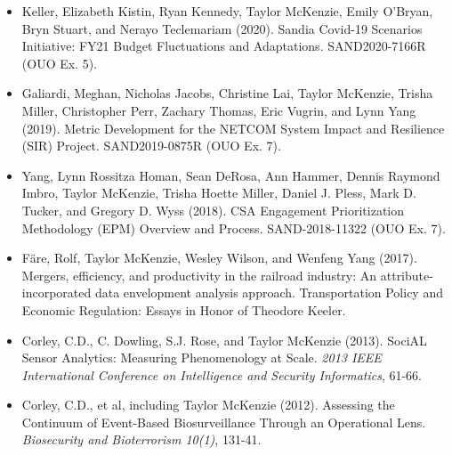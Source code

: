 \documentclass[11pt]{article}
\newenvironment{changemargin}[2]{%
  \begin{list}{}{%
    \setlength{\topsep}{0pt}%
    \setlength{\leftmargin}{#1}%
    \setlength{\rightmargin}{#2}%
    \setlength{\listparindent}{\parindent}%
    \setlength{\itemindent}{\parindent}%
    \setlength{\parsep}{\parskip}%
  }%
  \item[]}{\end{list}
}
\newcommand{\lineover}{
	\begin{changemargin}{-0.05in}{-0.05in}
		\vspace*{-8pt}
		\hrulefill \\
		\vspace*{-2pt}
	\end{changemargin}
}
\newcommand{\header}[1]{
	\begin{changemargin}{-0.5in}{-0.5in}
		\scshape{#1}\\
	\vspace*{-5pt}
  	\lineover
	\end{changemargin}
}
\newenvironment{body} {
	\vspace*{-16pt}
	\begin{changemargin}{-0.25in}{-0.5in}
  }	
	{\end{changemargin}
}
\begin{document}
\begin{body}
\begin{itemize}
	\item Keller, Elizabeth Kistin, Ryan Kennedy, Taylor McKenzie, Emily O'Bryan, Bryn Stuart, and Nerayo Teclemariam (2020). Sandia Covid-19 Scenarios Initiative: FY21 Budget Fluctuations and Adaptations. SAND2020-7166R (OUO Ex. 5).
	\item Galiardi, Meghan, Nicholas Jacobs, Christine Lai, Taylor McKenzie, Trisha Miller, Christopher Perr, Zachary Thomas, Eric Vugrin, and Lynn Yang (2019). Metric Development for the NETCOM System Impact and Resilience (SIR) Project. SAND2019-0875R (OUO Ex. 7).
	\item Yang, Lynn Rossitza Homan, Sean DeRosa, Ann Hammer, Dennis Raymond Imbro, Taylor McKenzie, Trisha Hoette Miller, Daniel J. Pless, Mark D. Tucker, and Gregory D. Wyss (2018). CSA Engagement Prioritization Methodology (EPM) Overview and Process. SAND-2018-11322 (OUO Ex. 7).
	\item F\"{a}re, Rolf, Taylor McKenzie, Wesley Wilson, and Wenfeng Yang (2017). Mergers, efficiency, and productivity in the railroad industry: An attribute-incorporated data envelopment analysis approach. Transportation Policy and Economic Regulation: Essays in Honor of Theodore Keeler.
	\item Corley, C.D., C. Dowling, S.J. Rose, and Taylor McKenzie (2013). SociAL Sensor Analytics: Measuring Phenomenology at Scale. \textit{2013 IEEE International Conference on Intelligence and Security Informatics}, 61-66.
	\item Corley, C.D., et al, including Taylor McKenzie (2012). Assessing the Continuum of Event-Based Biosurveillance Through an Operational Lens. \textit{Biosecurity and Bioterrorism 10(1)}, 131-41.
\end{itemize}
\end{body}



\end{document}
